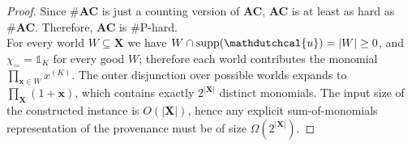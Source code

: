 \begin{proof}
  Since \#\textbf{AC} is just a counting version of \textbf{AC}, \textbf{AC} is at least as hard as \#\textbf{AC}. Therefore, \textbf{AC} is \#P-hard. \\
  For every world \(W\subseteq\mathbf{X}\) we have
  \(W\cap\mathrm{supp}(\mathdutchcal{u})=|W|\ge0\), and
  \(\chi_= = \mathbb{1}_K\) for every good \(W\); therefore each world contributes the monomial
  \(\prod_{\textbf{x}\in W} x^{(K)}\). The outer disjunction over possible worlds expands to \(\prod_\mathbf{X}(1+\mathbf{x})\), which
  contains exactly \(2^{|\mathbf{X}|}\) distinct monomials. The input size
  of the constructed instance is \(O(|\mathbf{X}|)\),
  hence any explicit sum-of-monomials representation of the provenance must be of size
  \(\Omega(2^{|\mathbf{X}|})\).

\end{proof}
